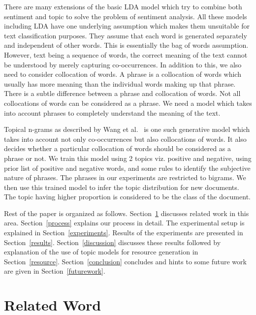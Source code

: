 \documentclass[11pt]{article}
\begin{document}
There are many extensions of the basic LDA model which try to combine both sentiment 
and topic to solve the problem of sentiment analysis. All these models including LDA 
have one underlying assumption which makes them unsuitable for text classification
purposes. They assume that each word is generated separately and independent of other 
words. This is essentially the bag of words assumption. However, text being a sequence 
of words, the correct meaning of the text cannot be understood by merely capturing
co-occurrences. In addition to this, we also need to consider collocation of words.
A phrase is a collocation of words which usually has more meaning than the individual
words making up that phrase. There is a subtle difference between a phrase and collocation
of words. Not all collocations of words can be considered as a phrase. We need a 
model which takes into account phrases to completely understand the meaning of the text.

Topical n-grams as described by Wang et al.~ is one such generative 
model which takes into account not only co-occurrences but also collocations of words. It 
also decides whether a particular collocation of words should be considered as a phrase or not. 
We train this model using 2 topics viz. positive and negative, using prior list of positive 
and negative words, and some rules to identify the subjective nature of phrases. The phrases
in our experiments are restricted to bigrams. We then use this trained model to infer the topic
distribution for new documents. The topic having higher proportion is considered to be
the class of the document.

Rest of the paper is organized as follows. Section~\ref{survey} discusses related work
in this area. Section~\ref{process} explains our process in detail. The experimental 
setup is explained in Section~\ref{experiments}. Results of the experiments are presented
in Section~\ref{results}. Section~\ref{discussion} discusses these results followed by
explanation of the use of topic models for resource generation in Section~\ref{resource}.
Section~\ref{conclusion} concludes and  hints to some future work are given in 
Section~\ref{futurework}.


\section{Related Word}\label{survey}
\end{document}
